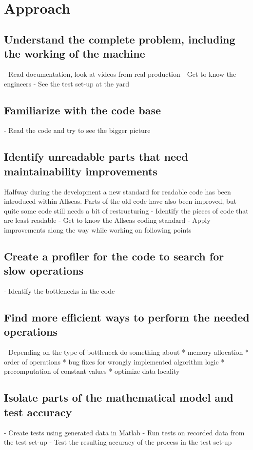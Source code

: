 \section{Approach}
\label{sec:approach}

\subsection{Understand the complete problem, including the working of the machine}
- Read documentation, look at videos from real production
- Get to know the engineers
- See the test set-up at the yard
 
\subsection{Familiarize with the code base}
- Read the code and try to see the bigger picture
 
\subsection{Identify unreadable parts that need maintainability improvements}
Halfway during the development a new standard for readable code has been introduced within Allseas. Parts of the old code have also been improved, but quite some code still needs a bit of restructuring
- Identify the pieces of code that are least readable
- Get to know the Allseas coding standard
- Apply improvements along the way while working on following points
 
\subsection{Create a profiler for the code to search for slow operations}
- Identify the bottlenecks in the code
 
\subsection{Find more efficient ways to perform the needed operations}
- Depending on the type of bottleneck do something about
 * memory allocation
 * order of operations
 * bug fixes for wrongly implemented algorithm logic
 * precomputation of constant values
 * optimize data locality 
 
\subsection{Isolate parts of the mathematical model and test accuracy}
- Create tests using generated data in Matlab
- Run tests on recorded data from the test set-up
- Test the resulting accuracy of the process in the test set-up
 
